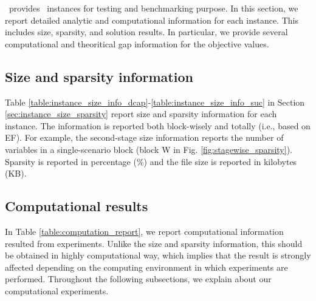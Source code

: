 %
%

\siplibtwo\ provides \smps\ instances for testing and benchmarking purpose. In this section, we report detailed analytic and computational information for each instance. This includes size, sparsity, and solution results. In particular, we provide several computational and theoritical gap information for the objective values.

\subsection{Size and sparsity information}
Table \ref{table:instance_size_info_dcap}-\ref{table:instance_size_info_suc} in Section \ref{sec:instance_size_sparsity} report size and sparsity information for each instance. The information is reported both block-wisely and totally (i.e., based on EF). For example, the second-stage size information reports the number of variables in a single-scenario block (block W in Fig. \ref{fig:stagewise_sparsity}). Sparsity is reported in percentage (\%) and the file size is reported in kilobytes (KB).

\subsection{Computational results}
In Table \ref{table:computation_report}, we report computational information resulted from experiments. Unlike the size and sparsity information, this should be obtained in highly computational way, which implies that the result is strongly affected depending on the computing environment in which experiments are performed. Throughout the following subsections, we explain about our computational experiments.


